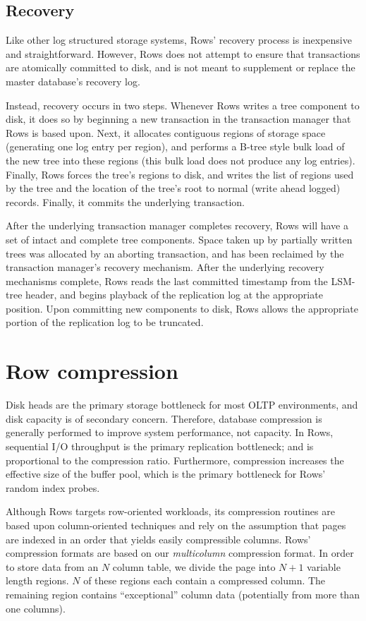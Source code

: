 \documentclass{sig-alternate-sigmod08}
\newcommand{\rows}{Rows\xspace}
\newcommand{\rowss}{Rows'\xspace}
\begin{document}
\subsection{Recovery}

Like other log structured storage systems, \rowss recovery process is
inexpensive and straightforward.  However, \rows does not attempt to
ensure that transactions are atomically committed to disk, and is not
meant to supplement or replace the master database's recovery log.

Instead, recovery occurs in two steps.  Whenever \rows writes a tree
component to disk, it does so by beginning a new transaction in the
transaction manager that \rows is based upon.  Next, it allocates
contiguous regions of storage space (generating one log entry per
region), and performs a B-tree style bulk load of the new tree into
these regions (this bulk load does not produce any log entries).
Finally, \rows forces the tree's regions to disk, and writes the list
of regions used by the tree and the location of the tree's root to
normal (write ahead logged) records.  Finally, it commits the
underlying transaction.

After the underlying transaction manager completes recovery, \rows
will have a set of intact and complete tree components.  Space taken
up by partially written trees was allocated by an aborting
transaction, and has been reclaimed by the transaction manager's
recovery mechanism.  After the underlying recovery mechanisms
complete, \rows reads the last committed timestamp from the LSM-tree
header, and begins playback of the replication log at the appropriate
position.  Upon committing new components to disk, \rows allows the
appropriate portion of the replication log to be truncated.

\section{Row compression}

Disk heads are the primary storage bottleneck for most OLTP
environments, and disk capacity is of secondary concern.  Therefore,
database compression is generally performed to improve system
performance, not capacity.  In \rows, sequential I/O throughput is the
primary replication bottleneck; and is proportional to the compression
ratio.  Furthermore, compression increases the effective size of the buffer
pool, which is the primary bottleneck for \rowss random index probes.

Although \rows targets row-oriented workloads, its compression
routines are based upon column-oriented techniques and rely on the
assumption that pages are indexed in an order that yields easily
compressible columns.  \rowss compression formats are based on our
{\em multicolumn} compression format.  In order to store data from
an $N$ column table, we divide the page into $N+1$ variable length
regions.  $N$ of these regions each contain a compressed column.  The
remaining region contains ``exceptional'' column data (potentially
from more than one columns).
\end{document}
